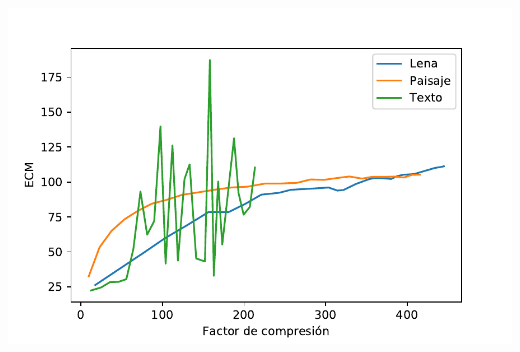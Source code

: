\documentclass{beamer}
\begin{document}
\begin{frame}
    \begin{center}
        \includegraphics[scale=0.7]{fig/FCvsECM.pdf}
    \end{center}
\end{frame}
\end{document}
